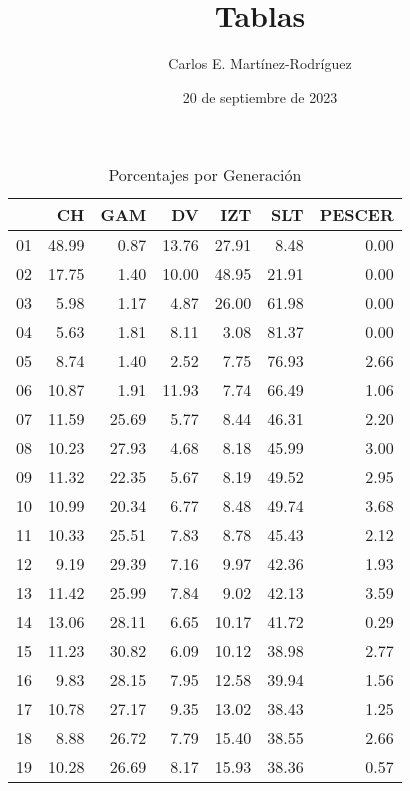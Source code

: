 \documentclass[12pt]{article}
\title{Tablas}
\author{Carlos E. Martínez-Rodríguez}
\date{20 de septiembre de 2023}
\begin{document}
\maketitle

\begin{table}[ht]
\centering
\caption{Porcentajes por Generación} 
\begin{tabular}{rrrrrrr}
  \hline
 & CH & GAM & DV & IZT & SLT & PESCER \\ 
  \hline
01 & 48.99 & 0.87 & 13.76 & 27.91 & 8.48 & 0.00 \\ 
  02 & 17.75 & 1.40 & 10.00 & 48.95 & 21.91 & 0.00 \\ 
  03 & 5.98 & 1.17 & 4.87 & 26.00 & 61.98 & 0.00 \\ 
  04 & 5.63 & 1.81 & 8.11 & 3.08 & 81.37 & 0.00 \\ 
  05 & 8.74 & 1.40 & 2.52 & 7.75 & 76.93 & 2.66 \\ 
  06 & 10.87 & 1.91 & 11.93 & 7.74 & 66.49 & 1.06 \\ 
  07 & 11.59 & 25.69 & 5.77 & 8.44 & 46.31 & 2.20 \\ 
  08 & 10.23 & 27.93 & 4.68 & 8.18 & 45.99 & 3.00 \\ 
  09 & 11.32 & 22.35 & 5.67 & 8.19 & 49.52 & 2.95 \\ 
  10 & 10.99 & 20.34 & 6.77 & 8.48 & 49.74 & 3.68 \\ 
  11 & 10.33 & 25.51 & 7.83 & 8.78 & 45.43 & 2.12 \\ 
  12 & 9.19 & 29.39 & 7.16 & 9.97 & 42.36 & 1.93 \\ 
  13 & 11.42 & 25.99 & 7.84 & 9.02 & 42.13 & 3.59 \\ 
  14 & 13.06 & 28.11 & 6.65 & 10.17 & 41.72 & 0.29 \\ 
  15 & 11.23 & 30.82 & 6.09 & 10.12 & 38.98 & 2.77 \\ 
  16 & 9.83 & 28.15 & 7.95 & 12.58 & 39.94 & 1.56 \\ 
  17 & 10.78 & 27.17 & 9.35 & 13.02 & 38.43 & 1.25 \\ 
  18 & 8.88 & 26.72 & 7.79 & 15.40 & 38.55 & 2.66 \\ 
  19 & 10.28 & 26.69 & 8.17 & 15.93 & 38.36 & 0.57 \\ 
   \hline
\end{tabular}
\end{table}
\end{document}
